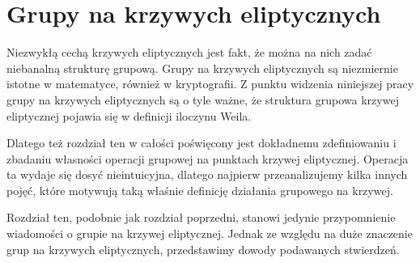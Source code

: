 \chapter{Grupy na krzywych eliptycznych}

\noindent
Niezwykłą cechą krzywych eliptycznych jest fakt,
że można na nich zadać niebanalną strukturę grupową.
Grupy na krzywych eliptycznych
są niezmiernie istotne w matematyce,
również w kryptografii.
Z punktu widzenia niniejszej pracy
grupy na krzywych eliptycznych są o tyle ważne,
że struktura grupowa krzywej eliptycznej
pojawia się w definicji iloczynu Weila.

\noindent
Dlatego też rozdział ten w całości poświęcony jest
dokładnemu zdefiniowaniu i zbadaniu własności
operacji grupowej na punktach krzywej eliptycznej.
Operacja ta wydaje się dosyć nieintuicyjna,
dlatego najpierw przeanalizujemy kilka innych pojęć,
które motywują taką właśnie
definicję działania grupowego na krzywej.

\noindent
Rozdział ten, podobnie jak rozdział poprzedni,
stanowi jedynie przypomnienie wiadomości
o grupie na krzywej eliptycznej.
Jednak ze względu na duże znaczenie grup na krzywych eliptycznych,
przedstawimy dowody podawanych stwierdzeń.








